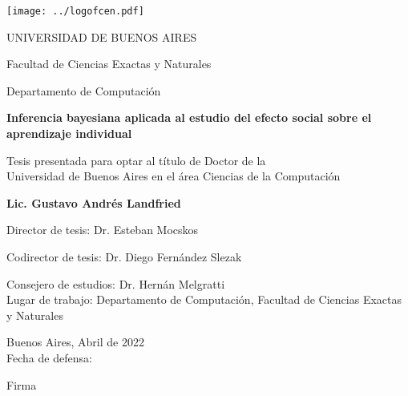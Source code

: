 \documentclass[a4paper,10pt]{book}
\author{Gustavo Landfried}
\makeatletter
\renewcommand{\frontmatter}{\cleardoublepage\@mainmatterfalse}
\theoremstyle{definition}
\newcommand{\TITULO}[0]{Inferencia bayesiana aplicada al estudio del efecto social sobre el aprendizaje individual}
\makeatother
\begin{document}
\deactivatequoting %

\frontmatter
{}

\begin{center}

\texttt{[image: ../logofcen.pdf]}

\medskip
UNIVERSIDAD DE BUENOS AIRES

Facultad de Ciencias Exactas y Naturales

Departamento de Computaci\'on


\vspace{3cm}

\textbf{\LARGE \TITULO}

\vspace{1cm}



Tesis presentada para optar al t\'itulo de Doctor de la \\
Universidad de Buenos Aires en el \'area Ciencias de la Computaci\'on

\vspace{3cm}

\textbf{Lic. Gustavo Andr\'es Landfried}

\end{center}

\vspace{2.5cm}

\noindent Director de tesis: Dr. Esteban Mocskos 

\noindent Codirector de tesis: Dr. Diego Fern\'andez Slezak

\noindent Consejero de estudios: Dr. Hern\'an Melgratti \\

\noindent Lugar de trabajo: Departamento de Computaci\'on, Facultad de Ciencias Exactas y Naturales

\vspace{0.5cm}

\noindent Buenos Aires, Abril de 2022\\

\noindent Fecha de defensa: \\%

\vspace{0.5cm}

\hspace*{0pt}\hfill Firma \hspace{2cm}
\end{document}
